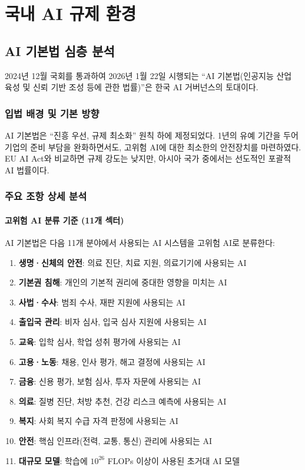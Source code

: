 \section{국내 AI 규제 환경}

\subsection{AI 기본법 심층 분석}
2024년 12월 국회를 통과하여 2026년 1월 22일 시행되는 ``AI 기본법(인공지능 산업 육성 및 신뢰 기반 조성 등에 관한 법률)''은 한국 AI 거버넌스의 토대이다.\cite{cset2025korea_ai_act}

\subsubsection{입법 배경 및 기본 방향}
AI 기본법은 ``진흥 우선, 규제 최소화'' 원칙 하에 제정되었다. 1년의 유예 기간을 두어 기업의 준비 부담을 완화하면서도, 고위험 AI에 대한 최소한의 안전장치를 마련하였다. EU AI Act와 비교하면 규제 강도는 낮지만, 아시아 국가 중에서는 선도적인 포괄적 AI 법률이다.

\subsubsection{주요 조항 상세 분석}

\paragraph{고위험 AI 분류 기준 (11개 섹터)}
AI 기본법은 다음 11개 분야에서 사용되는 AI 시스템을 고위험 AI로 분류한다:

\begin{enumerate}
 \item \textbf{생명·신체의 안전}: 의료 진단, 치료 지원, 의료기기에 사용되는 AI
 \item \textbf{기본권 침해}: 개인의 기본적 권리에 중대한 영향을 미치는 AI
 \item \textbf{사법·수사}: 범죄 수사, 재판 지원에 사용되는 AI
 \item \textbf{출입국 관리}: 비자 심사, 입국 심사 지원에 사용되는 AI
 \item \textbf{교육}: 입학 심사, 학업 성취 평가에 사용되는 AI
 \item \textbf{고용·노동}: 채용, 인사 평가, 해고 결정에 사용되는 AI
 \item \textbf{금융}: 신용 평가, 보험 심사, 투자 자문에 사용되는 AI
 \item \textbf{의료}: 질병 진단, 처방 추천, 건강 리스크 예측에 사용되는 AI
 \item \textbf{복지}: 사회 복지 수급 자격 판정에 사용되는 AI
 \item \textbf{안전}: 핵심 인프라(전력, 교통, 통신) 관리에 사용되는 AI
 \item \textbf{대규모 모델}: 학습에 $10^{26}$ FLOPs 이상이 사용된 초거대 AI 모델
\end{enumerate}

